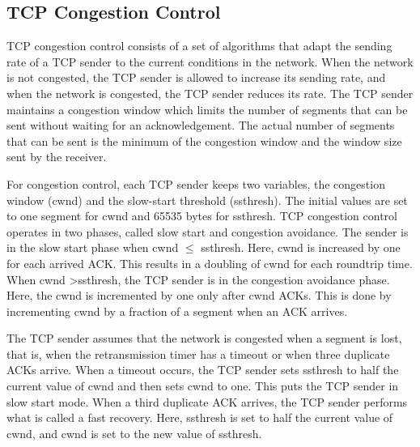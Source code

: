 \begin{questions}
\end{questions}

\newpage
\subsection{TCP Congestion Control}

TCP congestion control consists of a set of algorithms that adapt the sending rate of a TCP sender to the current conditions in the network. When the network is not congested, the TCP sender is allowed to increase its sending rate, and when the network is congested, the TCP sender reduces its rate. The TCP sender maintains a congestion window which limits the number of segments that can be sent without waiting for an acknowledgement. The actual number of segments that can be sent is the minimum of the congestion window and the window size sent by the receiver.

For congestion control, each TCP sender keeps two variables, the congestion window (cwnd) and the slow-start threshold (ssthresh). The initial values are set to one segment for cwnd and 65535 bytes for ssthresh. TCP congestion control operates in two phases, called slow start and congestion avoidance. The sender is in the slow start phase when cwnd $\le$ ssthresh. Here, cwnd is increased by one for each arrived ACK. This results in a doubling of cwnd for each roundtrip time. When cwnd \textgreater  ssthresh, the TCP sender is in the congestion avoidance phase. Here, the cwnd is incremented by one only after cwnd ACKs. This is done by incrementing cwnd by a fraction of a segment when an ACK arrives.

The TCP sender assumes that the network is congested when a segment is lost, that is, when the retransmission timer has a timeout or when three duplicate ACKs arrive. When a timeout occurs, the TCP sender sets ssthresh to half the current value of cwnd and then sets cwnd to one. This puts the TCP sender in slow start mode. When a third duplicate ACK arrives, the TCP sender performs what is called a fast recovery. Here, ssthresh is set to half the current value of cwnd, and cwnd is set to the new value of ssthresh.

